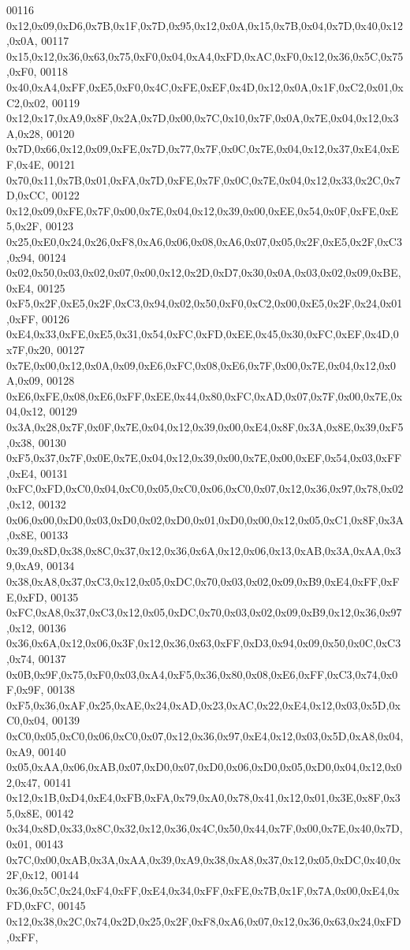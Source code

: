 \begin{DoxyCode}
00116 0x12,0x09,0xD6,0x7B,0x1F,0x7D,0x95,0x12,0x0A,0x15,0x7B,0x04,0x7D,0x40,0x12,0x0A,
00117 0x15,0x12,0x36,0x63,0x75,0xF0,0x04,0xA4,0xFD,0xAC,0xF0,0x12,0x36,0x5C,0x75,0xF0,
00118 0x40,0xA4,0xFF,0xE5,0xF0,0x4C,0xFE,0xEF,0x4D,0x12,0x0A,0x1F,0xC2,0x01,0xC2,0x02,
00119 0x12,0x17,0xA9,0x8F,0x2A,0x7D,0x00,0x7C,0x10,0x7F,0x0A,0x7E,0x04,0x12,0x3A,0x28,
00120 0x7D,0x66,0x12,0x09,0xFE,0x7D,0x77,0x7F,0x0C,0x7E,0x04,0x12,0x37,0xE4,0xEF,0x4E,
00121 0x70,0x11,0x7B,0x01,0xFA,0x7D,0xFE,0x7F,0x0C,0x7E,0x04,0x12,0x33,0x2C,0x7D,0xCC,
00122 0x12,0x09,0xFE,0x7F,0x00,0x7E,0x04,0x12,0x39,0x00,0xEE,0x54,0x0F,0xFE,0xE5,0x2F,
00123 0x25,0xE0,0x24,0x26,0xF8,0xA6,0x06,0x08,0xA6,0x07,0x05,0x2F,0xE5,0x2F,0xC3,0x94,
00124 0x02,0x50,0x03,0x02,0x07,0x00,0x12,0x2D,0xD7,0x30,0x0A,0x03,0x02,0x09,0xBE,0xE4,
00125 0xF5,0x2F,0xE5,0x2F,0xC3,0x94,0x02,0x50,0xF0,0xC2,0x00,0xE5,0x2F,0x24,0x01,0xFF,
00126 0xE4,0x33,0xFE,0xE5,0x31,0x54,0xFC,0xFD,0xEE,0x45,0x30,0xFC,0xEF,0x4D,0x7F,0x20,
00127 0x7E,0x00,0x12,0x0A,0x09,0xE6,0xFC,0x08,0xE6,0x7F,0x00,0x7E,0x04,0x12,0x0A,0x09,
00128 0xE6,0xFE,0x08,0xE6,0xFF,0xEE,0x44,0x80,0xFC,0xAD,0x07,0x7F,0x00,0x7E,0x04,0x12,
00129 0x3A,0x28,0x7F,0x0F,0x7E,0x04,0x12,0x39,0x00,0xE4,0x8F,0x3A,0x8E,0x39,0xF5,0x38,
00130 0xF5,0x37,0x7F,0x0E,0x7E,0x04,0x12,0x39,0x00,0x7E,0x00,0xEF,0x54,0x03,0xFF,0xE4,
00131 0xFC,0xFD,0xC0,0x04,0xC0,0x05,0xC0,0x06,0xC0,0x07,0x12,0x36,0x97,0x78,0x02,0x12,
00132 0x06,0x00,0xD0,0x03,0xD0,0x02,0xD0,0x01,0xD0,0x00,0x12,0x05,0xC1,0x8F,0x3A,0x8E,
00133 0x39,0x8D,0x38,0x8C,0x37,0x12,0x36,0x6A,0x12,0x06,0x13,0xAB,0x3A,0xAA,0x39,0xA9,
00134 0x38,0xA8,0x37,0xC3,0x12,0x05,0xDC,0x70,0x03,0x02,0x09,0xB9,0xE4,0xFF,0xFE,0xFD,
00135 0xFC,0xA8,0x37,0xC3,0x12,0x05,0xDC,0x70,0x03,0x02,0x09,0xB9,0x12,0x36,0x97,0x12,
00136 0x36,0x6A,0x12,0x06,0x3F,0x12,0x36,0x63,0xFF,0xD3,0x94,0x09,0x50,0x0C,0xC3,0x74,
00137 0x0B,0x9F,0x75,0xF0,0x03,0xA4,0xF5,0x36,0x80,0x08,0xE6,0xFF,0xC3,0x74,0x0F,0x9F,
00138 0xF5,0x36,0xAF,0x25,0xAE,0x24,0xAD,0x23,0xAC,0x22,0xE4,0x12,0x03,0x5D,0xC0,0x04,
00139 0xC0,0x05,0xC0,0x06,0xC0,0x07,0x12,0x36,0x97,0xE4,0x12,0x03,0x5D,0xA8,0x04,0xA9,
00140 0x05,0xAA,0x06,0xAB,0x07,0xD0,0x07,0xD0,0x06,0xD0,0x05,0xD0,0x04,0x12,0x02,0x47,
00141 0x12,0x1B,0xD4,0xE4,0xFB,0xFA,0x79,0xA0,0x78,0x41,0x12,0x01,0x3E,0x8F,0x35,0x8E,
00142 0x34,0x8D,0x33,0x8C,0x32,0x12,0x36,0x4C,0x50,0x44,0x7F,0x00,0x7E,0x40,0x7D,0x01,
00143 0x7C,0x00,0xAB,0x3A,0xAA,0x39,0xA9,0x38,0xA8,0x37,0x12,0x05,0xDC,0x40,0x2F,0x12,
00144 0x36,0x5C,0x24,0xF4,0xFF,0xE4,0x34,0xFF,0xFE,0x7B,0x1F,0x7A,0x00,0xE4,0xFD,0xFC,
00145 0x12,0x38,0x2C,0x74,0x2D,0x25,0x2F,0xF8,0xA6,0x07,0x12,0x36,0x63,0x24,0xFD,0xFF,

\end{DoxyCode}
